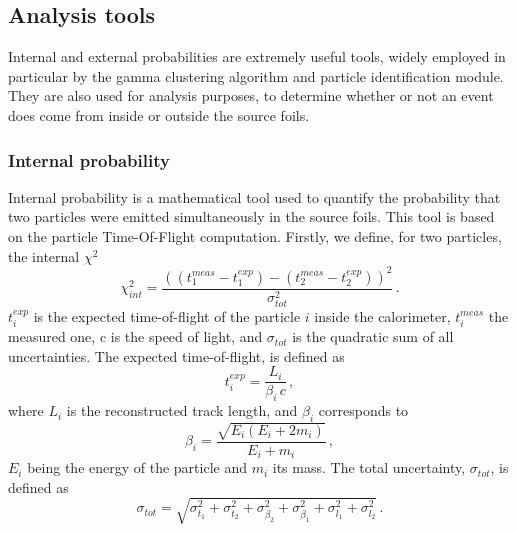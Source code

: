 \subsection{Analysis tools}
\label{subsec:analysis_tools}

Internal and external probabilities are extremely useful tools, widely employed in particular by the gamma clustering algorithm and particle identification module.
They are also used for analysis purposes, to determine whether or not an event does come from inside or outside the source foils.

\subsubsection{Internal probability}
\label{subsec:internal_prob}

Internal probability is a mathematical tool used to quantify the probability that two particles were emitted simultaneously in the source foils.
This tool is based on the particle Time-Of-Flight computation.
Firstly, we define, for two particles, the internal $\chi^{2}$
\begin{equation}
  \chi^{2}_{int}=\frac{((t^{meas}_{1} - t^{exp}_{1}) - (t^{meas}_{2} - t^{exp}_{2}))^{2}}{\sigma_{tot}^{2}}\,.
  \label{eq:int_chi2}
\end{equation}
$t^{exp}_{i}$ is the expected time-of-flight of the particle $i$ inside the calorimeter, $t^{meas}_{i}$ the measured one, c is the speed of light, and $\sigma_{tot}$ is the quadratic sum of all uncertainties.
The expected time-of-flight, is defined as
\begin{equation}
  t^{exp}_{i}=\frac{L_{i}}{\beta_{i}\,c}\,,
  \label{eq:th_time}
\end{equation}
where $L_{i}$ is the reconstructed track length, and $\beta_{i}$ corresponds to
\begin{equation}
  \beta_{i}=\frac{\sqrt{E_{i}(E_{i} + 2m_{i})}}{E_{i} + m_{i}}\,,
  \label{eq:beta_i}
\end{equation}
$E_{i}$ being the energy of the particle and $m_{i}$ its mass.
The total uncertainty, $\sigma_{tot}$, is defined as
\begin{equation}
  \sigma_{tot}=\sqrt{\sigma_{t_{1}}^{2}+\sigma_{t_{2}}^{2}+\sigma_{\beta_{2}}^{2}+\sigma_{\beta_{1}}^{2}+\sigma_{l_{1}}^{2}+\sigma_{l_{2}}^{2}} \,.
  \label{eq:sigma_tot}
\end{equation}

